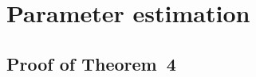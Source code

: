 \documentclass[12pt]{article}
\begin{document}
\newpage 

\section{Parameter estimation}

\subsection{Proof of Theorem~4}
\end{document}
